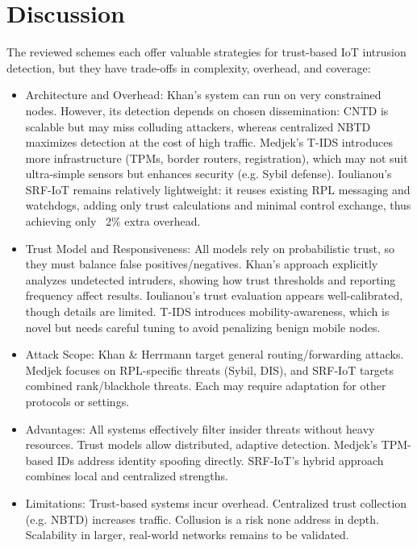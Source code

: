 \documentclass[final,5p,times,twocolumn]{elsarticle}
\begin{document}
\section{Discussion}
The reviewed schemes each offer valuable strategies for trust-based IoT intrusion detection, but they have trade-offs in complexity, overhead, and coverage:
\begin{itemize}
  \item{Architecture and Overhead}: 
  {\normalsize Khan’s system can run on very constrained nodes. However, its detection depends on chosen dissemination: CNTD is scalable but may miss colluding attackers, whereas centralized NBTD maximizes detection at the cost of high traffic. Medjek’s T-IDS introduces more infrastructure (TPMs, border routers, registration), which may not suit ultra-simple sensors but enhances security (e.g. Sybil defense). Ioulianou’s SRF-IoT remains relatively lightweight: it reuses existing RPL messaging and watchdogs, adding only trust calculations and minimal control exchange, thus achieving only ~2\% extra overhead.}
  \item{Trust Model and Responsiveness}:
  {\normalsize All models rely on probabilistic trust, so they must balance false positives/negatives. Khan’s approach explicitly analyzes undetected intruders, showing how trust thresholds and reporting frequency affect results. Ioulianou’s trust evaluation appears well-calibrated, though details are limited. T-IDS introduces mobility-awareness, which is novel but needs careful tuning to avoid penalizing benign mobile nodes.}
  \item{Attack Scope}:
  {\normalsize Khan \& Herrmann target general routing/forwarding attacks. Medjek focuses on RPL-specific threats (Sybil, DIS), and SRF-IoT targets combined rank/blackhole threats. Each may require adaptation for other protocols or settings.}
  \item{Advantages}:
  {\normalsize All systems effectively filter insider threats without heavy resources. Trust models allow distributed, adaptive detection. Medjek’s TPM-based IDs address identity spoofing directly. SRF-IoT’s hybrid approach combines local and centralized strengths.}
  \item{Limitations}:
  {\normalsize Trust-based systems incur overhead. Centralized trust collection (e.g. NBTD) increases traffic. Collusion is a risk none address in depth. Scalability in larger, real-world networks remains to be validated.}
\end{itemize}
\end{document}
